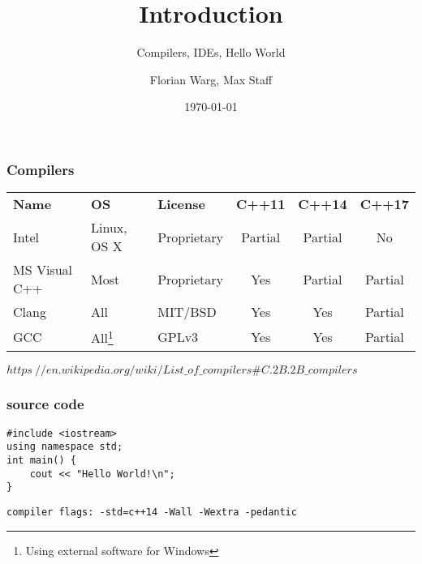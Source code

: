 



\title{Introduction}
\subtitle{Compilers, IDEs, Hello World}
\date{\today}
\author{Florian Warg, Max Staff}

\maketitle

\begin{frame}[fragile]
    \frametitle{Compilers}
    \begin{tabular}{lllccc}
        \textbf{Name} & \textbf{OS} & \textbf{License} & \textbf{C++11} & \textbf{C++14} & \textbf{C++17} \\
        Intel & Linux, OS X & Proprietary & Partial & Partial & No \\
        MS Visual C++ & Most & Proprietary & Yes & Partial & Partial \\
        Clang & All & MIT/BSD & Yes & Yes & Partial \\
        GCC & All\footnote{Using external software for Windows} & GPLv3 & Yes & Yes & Partial \\
    \end{tabular} \bigskip
    $https\://en.wikipedia.org/wiki/List\_of\_compilers\#C.2B.2B\_compilers$
\end{frame}

\begin{frame}[fragile]
    \frametitle{source code}
\begin{lstlisting}
#include <iostream>
using namespace std;
int main() {
    cout << "Hello World!\n";
}
\end{lstlisting}
\begin{lstlisting}[numbers=none]
compiler flags: -std=c++14 -Wall -Wextra -pedantic
\end{lstlisting}
\end{frame}


